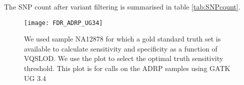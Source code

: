 The SNP count after variant filtering is summarised in table \ref{tab:SNPcount}.

\begin{figure}[!htbp]
\centering
\texttt{[image: FDR\_ADRP\_UG34]}
\caption[ROC curve for SNPs and indels.]{We used sample NA12878 for which a gold standard truth set is available to calculate sensitivity and specificity as a function of VQSLOD. We use the plot to select the optimal truth sensitivity threshold. This plot is for calls on the \gls{ADRP} samples using \gls{GATK} \gls{UG} 3.4}
\label{fig:ROC1}
\end{figure}